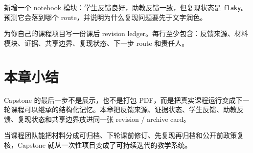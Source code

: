 \begin{exercisebox}[进阶练习]
新增一个 notebook 模块：学生反馈良好，助教反馈一致，但复现状态是 \texttt{flaky}。预测它会落到哪个 route，并说明为什么复现问题要先于文字润色。
\end{exercisebox}

\begin{exercisebox}[开放练习]
为你自己的课程项目写一份课后 revision ledger。每行至少包含：反馈来源、材料模块、证据、共享边界、复现状态、下一步 route 和责任人。
\end{exercisebox}

\section{本章小结}

Capstone 的最后一步不是展示，也不是打包 PDF，而是把真实课程运行变成下一轮课程可以继承的结构化记忆。本章把反馈来源、证据状态、学生反馈、助教反馈、复现状态和共享边界放进同一张 revision / archive card。

当课程团队能把材料分成可归档、下轮课前修订、先复现再归档和公开前政策复核，Capstone 就从一次性项目变成了可持续迭代的教学系统。
